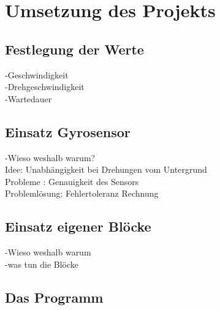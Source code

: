 \chapter{Umsetzung des Projekts}
\section{Festlegung der Werte}
-Geschwindigkeit\\
-Drehgeschwindigkeit\\
-Wartedauer\\

\section{Einsatz Gyrosensor}
-Wieso weshalb warum?\\
Idee: Unabhängigkeit bei Drehungen vom Untergrund\\
Probleme : Genauigkeit des Sensors\\
Problemlösung: Fehlertoleranz Rechnung
\section{Einsatz eigener Blöcke}
-Wieso weshalb warum\\
-was tun die Blöcke\\
\section{Das Programm}
